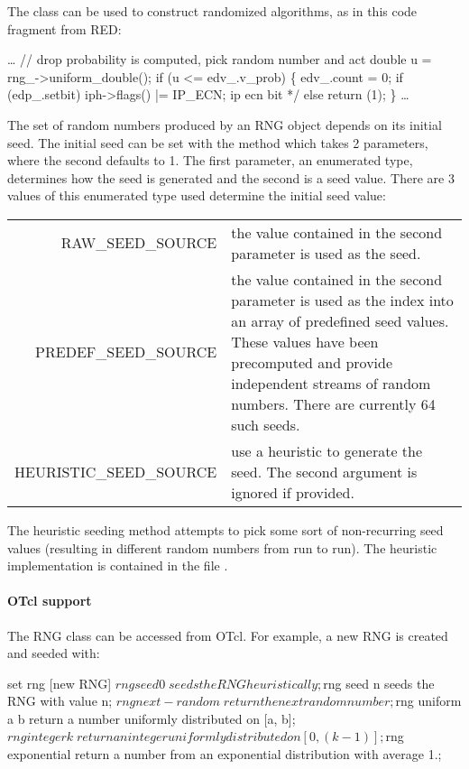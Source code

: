 The  class can be used to construct randomized algorithms,
as in this code fragment from RED:
\begin{program}
        \ldots
        // {\cf drop probability is computed, pick random number and act}
        double u = rng_->uniform_double();
        if (u <= edv_.v_prob) \{
                edv_.count = 0;
                if (edp_.setbit) 
                        iph->flags() |= IP_ECN; \* ip ecn bit */
                else
                        return (1);
        \}
        \ldots
\end{program}
The set of random numbers produced by an RNG object depends on its
initial seed.  The initial seed can be set with the  method
which takes 2 parameters, where the second
defaults to 1.  The first parameter, an enumerated type,
determines how
the seed is generated and the second is a seed value.  There are 3
values of this enumerated type used determine the initial seed value:

\begin{tabularx}{\linewidth}{rX}
RAW\_SEED\_SOURCE &  the value contained in the second parameter is used
                        as the seed.\\
PREDEF\_SEED\_SOURCE &  the value contained in the second parameter is
        used as the index into an array of predefined seed values.  These
        values have been precomputed and provide independent streams of random
        numbers.  There are currently 64 such seeds.\\
HEURISTIC\_SEED\_SOURCE  & use a heuristic to generate the seed.
        The second argument is ignored if provided.\\
\end{tabularx}

The heuristic seeding method
attempts to pick some sort of non-recurring seed values (resulting
in different random numbers from run to run).  The heuristic implementation
is contained in the file .

\paragraph{OTcl support}
The RNG class can be accessed from OTcl.  For example, a new RNG is
created and seeded with:

\begin{program}
set rng [new RNG]
$rng seed 0 \; seeds the RNG heuristically;
$rng seed n \; seeds the RNG with value n;
$rng next-random \;  return the next random number;
$rng uniform a b \; return a number uniformly distributed on [a, b];
$rng integer k \; return an integer uniformly distributed on [0, (k-1)];
$rng exponential \; return a number from an exponential distribution with average 1.;
\end{program}

